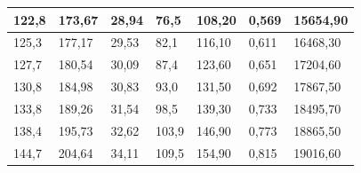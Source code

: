 \documentclass[a4paper,12pt]{article} %
\begin{document}
\begin{table}[h!]
\begin{tabular}{|l|l|l|l|l|l|l|}
		122,8                                     & 173,67                                                  & 28,94                                                 & 76,5                                     & 108,20                                                  & 0,569                        & 15654,90                                        \\ \hline
		125,3                                     & 177,17                                                  & 29,53                                                 & 82,1                                     & 116,10                                                  & 0,611                        & 16468,30                                        \\ \hline
		127,7                                     & 180,54                                                  & 30,09                                                 & 87,4                                     & 123,60                                                  & 0,651                        & 17204,60                                        \\ \hline
		130,8                                     & 184,98                                                  & 30,83                                                 & 93,0                                     & 131,50                                                  & 0,692                        & 17867,50                                        \\ \hline
		133,8                                     & 189,26                                                  & 31,54                                                 & 98,5                                     & 139,30                                                  & 0,733                        & 18495,70                                        \\ \hline
		138,4                                     & 195,73                                                  & 32,62                                                 & 103,9                                    & 146,90                                                  & 0,773                        & 18865,50                                        \\ \hline
		144,7                                     & 204,64                                                  & 34,11                                                 & 109,5                                    & 154,90                                                  & 0,815                        & 19016,60                                        \\ \hline

\end{tabular}
\end{table}
\end{document}
